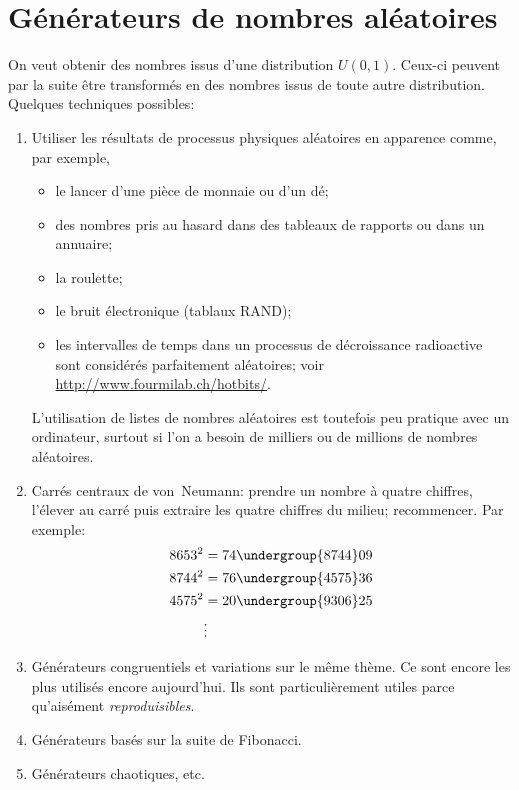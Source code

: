 \section{Générateurs de nombres aléatoires}
\label{sec:generation:generateurs}

On veut obtenir des nombres issus d'une distribution $U(0, 1)$.
Ceux-ci peuvent par la suite être transformés en des nombres issus de
toute autre distribution. Quelques techniques possibles:
\begin{enumerate}
\item Utiliser les résultats de processus physiques aléatoires en
  apparence comme, par exemple,
  \begin{itemize}
  \item le lancer d'une pièce de monnaie ou d'un dé;
  \item des nombres pris au hasard dans des tableaux de rapports ou
    dans un annuaire;
  \item la roulette;
  \item le bruit électronique (tablaux RAND);
  \item les intervalles de temps dans un processus de décroissance
    radioactive sont considérés parfaitement aléatoires; voir
    \url{http://www.fourmilab.ch/hotbits/}.
  \end{itemize}
  L'utilisation de listes de nombres aléatoires est toutefois peu
  pratique avec un ordinateur, surtout si l'on a besoin de milliers ou
  de millions de nombres aléatoires.
\item Carrés centraux de von~Neumann: prendre un nombre à quatre
  chiffres, l'élever au carré puis extraire les quatre chiffres du
  milieu; recommencer. Par exemple:
  \begin{align*}
    8653^2 &= 74\undergroup{8744}09 \\
    8744^2 &= 76\undergroup{4575}36 \\
    4575^2 &= 20\undergroup{9306}25 \\
    &\vdots
  \end{align*}
\item Générateurs congruentiels et variations sur le même thème. Ce
  sont encore les plus utilisés encore aujourd'hui. Ils sont
  particulièrement utiles parce qu'aisément \emph{reproduisibles}.
\item Générateurs basés sur la suite de Fibonacci.
\item Générateurs chaotiques, etc.
\end{enumerate}


